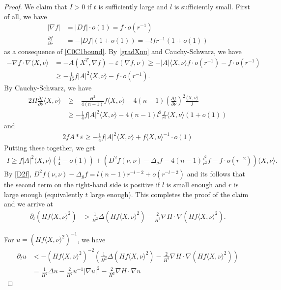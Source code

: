\documentclass[12pt,twoside]{article}
\theoremstyle{plain}
\theoremstyle{definition}
\theoremstyle{remark}
\newcommand{\pl}{\partial}
\newcommand{\na}{\nabla}
\newcommand{\lt}{\left}
\newcommand{\rt}{\right}
\numberwithin{equation}{section}
\begin{document}
\begin{proof}
We claim that $I > 0$ if $t$ is sufficiently large and $l$ is sufficiently small. First of all, we have 
\begin{align*}
|\na f| &= |Df| \cdot o(1) = f \cdot o(r^{-1}) \\
\frac{\pl f}{\pl\nu} &= - |Df| (1 + o(1)) = - lf r^{-1} (1 + o(1))
\end{align*}
as a consequence of \eqref{C0C1bound}.
By \eqref{gradXnu} and Cauchy-Schwarz, we have
\begin{align*}
- \na f \cdot \na \langle X,\nu \rangle &= - A(X^T,\na f) - \varepsilon (\na f,\nu) \ge  - |A|\langle X,\nu \rangle f \cdot o(r^{-1}) - f \cdot o(r^{-1}) \\
&\ge -\frac{1}{16} f |A|^2 \langle X,\nu \rangle  - f \cdot o(r^{-1}).
\end{align*}
By Cauchy-Schwarz, we have
\begin{align*}
2H \frac{\pl f}{\pl\nu} \langle X,\nu \rangle &\ge - \frac{H^2}{4(n-1)} f \langle X,\nu \rangle - 4(n-1) \lt( \frac{\pl f}{\pl\nu}\rt)^2 \frac{\langle X,\nu \rangle}{f} \\
&\ge - \frac{1}{4} f |A|^2 \langle X,\nu \rangle - 4(n-1)l^2 \frac{f}{r^2} \langle X,\nu \rangle (1 + o(1))
\end{align*}
and
\begin{align*}
2f A * \varepsilon \ge - \frac{1}{4}f |A|^2 \langle X,\nu \rangle + f \langle X,\nu \rangle^{-1} \cdot o(1)
\end{align*}
Putting these together, we get
\begin{align*}
I \ge f|A|^2 \langle X,\nu \rangle \lt( \frac{1}{4} - o(1) \rt) + \lt( D^2 f(\nu,\nu) - \Delta_g f - 4(n-1) \frac{l^2}{r^2} f - f \cdot o(r^{-2}) \rt)\langle X,\nu \rangle.
\end{align*}
By \eqref{D2f}, $D^2 f(\nu,\nu) - \Delta_g f = l(n-1) r^{-l-2} + o(r^{-l-2})$ and its follows that the second term on the right-hand side is positive if $l$ is small enough and $r$ is large enough (equivalently $t$ large enough). This completes the proof of the claim and we arrive at
\begin{align*}
\pl_t \lt( Hf\langle X,\nu \rangle^2 \rt) &> \frac{1}{H^2}\Delta (Hf\langle X,\nu \rangle^2) - \frac{2}{H^3} \na H \cdot \na (Hf\langle X,\nu \rangle^2).
\end{align*}

For $u = \lt( Hf\langle X,\nu \rangle^2\rt)^{-1}$, we have
\begin{align*}
\pl_t u &< - (Hf \langle X,\nu \rangle^2)^{-2} \lt( \frac{1}{H^2}\Delta (Hf\langle X,\nu \rangle^2) - \frac{2}{H^3} \na H \cdot \na (Hf\langle X,\nu \rangle^2) \rt) \\
&= \frac{1}{H^2}\Delta u - \frac{2}{H^2} u^{-1} |\na u|^2 - \frac{2}{H^3} \na H \cdot \na u
\end{align*}
\end{proof}
\end{document}
